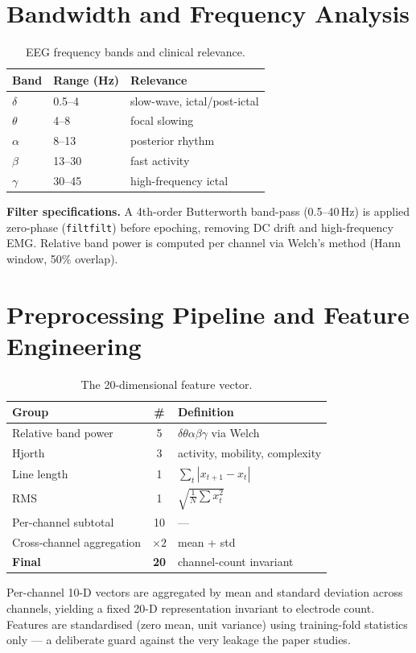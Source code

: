 \documentclass[10pt,journal,twocolumn]{IEEEtran}
\begin{document}
\section{Bandwidth and Frequency Analysis}
\begin{table}[h]\centering\caption{EEG frequency bands and clinical relevance.}\label{tab:bands}
\begin{tabular}{lll}\toprule
Band & Range (Hz) & Relevance\\\midrule
$\delta$ & 0.5--4 & slow-wave, ictal/post-ictal\\
$\theta$ & 4--8 & focal slowing\\
$\alpha$ & 8--13 & posterior rhythm\\
$\beta$ & 13--30 & fast activity\\
$\gamma$ & 30--45 & high-frequency ictal\\\bottomrule
\end{tabular}\end{table}
\textbf{Filter specifications.} A 4th-order Butterworth band-pass (0.5--40\,Hz) is applied zero-phase (\texttt{filtfilt}) before epoching, removing DC drift and high-frequency EMG. Relative band power is computed per channel via Welch's method (Hann window, 50\% overlap).

\section{Preprocessing Pipeline and Feature Engineering}\label{sec:feat}
\begin{table}[h]\centering\caption{The 20-dimensional feature vector.}\label{tab:feat}
\begin{tabular}{lcl}\toprule
Group & \# & Definition\\\midrule
Relative band power & 5 & $\delta\theta\alpha\beta\gamma$ via Welch\\
Hjorth & 3 & activity, mobility, complexity\\
Line length & 1 & $\sum_t|x_{t+1}-x_t|$\\
RMS & 1 & $\sqrt{\frac1N\sum x_t^2}$\\\midrule
Per-channel subtotal & 10 & ---\\
Cross-channel aggregation & $\times2$ & mean + std\\\midrule
\textbf{Final} & \textbf{20} & channel-count invariant\\\bottomrule
\end{tabular}\end{table}
Per-channel 10-D vectors are aggregated by mean and standard deviation across channels, yielding a fixed 20-D representation invariant to electrode count. Features are standardised (zero mean, unit variance) using training-fold statistics only --- a deliberate guard against the very leakage the paper studies.
\end{document}

